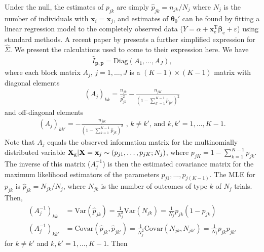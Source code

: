 \documentclass[10pt,a4paper]{article}
\def\bbetae{\bm{\beta}_{\text{e}}}
\def\bx{\mathbf{x}}
\def\bX{\mathbf{X}}
\def\bxe{\mathbf{x}_{\text{e}}}
\def\bXg{\mathbf{X}_{\text{g}}}
\begin{document}
Under the null, the estimates of $p_{jk}$ are simply $\hat{p}_{jk} = n_{jk}/N_j$ where $N_j$ is the number of individuals with $\bx_i = \bx_j$, and estimates of $\boldsymbol\theta_0'$ can be found by fitting a linear regression model to the completely observed data ($Y = \alpha + \bxe^{\text{T}} \bbetae + \varepsilon$) using standard methods. A recent paper by \cite{derkach2015score} presents a further simplified expression for $\hat{\Sigma}$. We present the calculations used to come to their expression here. We have
\begin{align*}
\hat{I}_{\mathbf{p}, \mathbf{p}} = 
\text{Diag}(A_1, \ldots, A_J),
\end{align*}
where each block matrix $A_{j}$, $j = 1, \ldots, J$ is a $(K-1) \times (K-1)$ matrix with diagonal elements
\begin{align*}
(A_j)_{kk} = \frac{n_{jk}}{\hat{p}_{jk}^2} - \frac{n_{jK}}{\left( 1- \sum_{k'=1}^{K-1} \hat{p}_{jk'} \right)^2}
\end{align*}
and off-diagonal elements
\begin{align*}
(A_j)_{kk'} = - \frac{n_{jK}}{\left( 1- \sum_{k=1}^{K-1} \hat{p}_{jk} \right)^2} \text{ , } k \neq k' \text{, and } k, k' = 1,\ldots, K-1.
\end{align*}
Note that $A_j$ equals the observed information matrix for the multinomially distributed variable $\bXg|\bX = \bx_j \sim \text(p_{j1},\ldots,p_{jK};N_j)$, where $p_{jK} = 1 - \sum_{k=1}^{K-1}p_{jk}$. The inverse of this matrix ($A_j^{-1}$) is then the estimated covariance matrix for the maximum likelihood estimators of the parameters $p_{j1}, \ldots, p_{j(K-1)}$. The MLE for $p_{jk}$ is $\hat{p}_{jk} = N_{jk}/N_j$, where $N_{jk}$ is the number of outcomes of type $k$ of $N_j$ trials. Then,
\begin{align*}
(A_j^{-1})_{kk} &= \text{Var}(\hat{p}_{jk}) = \frac{1}{N_j^2} \text{Var}(N_{jk}) = \frac{1}{N_j} p_{jk}(1-p_{jk}) \\
(A_j^{-1})_{kk'} & = \text{Covar}(\hat{p}_{jk},\hat{p}_{jk'}) = \frac{1}{N_j^2} \text{Covar}(N_{jk},N_{jk'}) = \frac{1}{N_j} p_{jk}p_{jk'}
\end{align*}
for $k\neq k'$ and $k,k' = 1,\ldots,K-1$. Then
\end{document}
